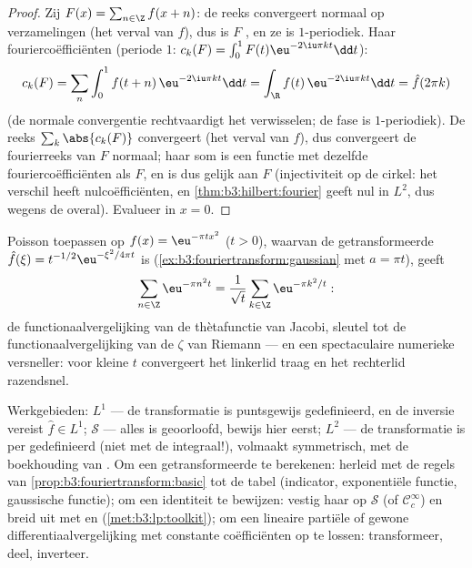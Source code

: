 \begin{proof}
Zij $F(x) = \sum_{n\in\Z}f(x + n)$: de reeks convergeert normaal
op  verzamelingen (het verval van $f$), dus is $F$
, en ze is $1$-periodiek. Haar fouriercoëfficiënten
(periode $1$: $c_k(F) = \int_0^1F(t)\eu^{-2\iu\pi kt}\dd t$):
\[
c_k(F) = \sum_n\int_0^1 f(t + n)\,\eu^{-2\iu\pi kt}\dd t
= \int_\R f(t)\,\eu^{-2\iu\pi kt}\dd t = \hat f(2\pi k)
\]
(de normale convergentie rechtvaardigt het verwisselen; de fase
is $1$-periodiek). De reeks $\sum_k\abs{c_k(F)}$ convergeert (het
verval van $\hat f$), dus convergeert de fourierreeks van $F$
normaal; haar som is een  functie met dezelfde
fouriercoëfficiënten als $F$, en is dus gelijk aan $F$
(injectiviteit op de cirkel: het verschil heeft nulcoëfficiënten,
en \cref{thm:b3:hilbert:fourier} geeft nul in $L^2$, dus wegens
de  overal). Evalueer in $x = 0$.
\end{proof}

\begin{example}
\label{ex:b3:fouriertransform:theta}
Poisson toepassen op $f(x) = \eu^{-\pi tx^2}$ ($t > 0$), waarvan
de getransformeerde $\hat f(\xi) = t^{-1/2}\eu^{-\xi^2/4\pi t}$
is (\cref{ex:b3:fouriertransform:gaussian} met $a = \pi t$),
geeft
\[
\sum_{n\in\Z}\eu^{-\pi n^2t}
= \frac1{\sqrt t}\sum_{k\in\Z}\eu^{-\pi k^2/t} :
\]
de functionaalvergelijking van de thètafunctie van Jacobi,
sleutel tot de functionaalvergelijking van de $\zeta$ van Riemann
--- en een spectaculaire numerieke versneller: voor kleine $t$
convergeert het linkerlid traag en het rechterlid razendsnel.
\end{example}

\begin{method}\label{met:b3:fouriertransform:method}
Werkgebieden: $L^1$ --- de transformatie is puntsgewijs
gedefinieerd, en de inversie vereist $\hat f \in L^1$; $\mathcal
S$ --- alles is geoorloofd, bewijs hier eerst; $L^2$ --- de
transformatie is per  gedefinieerd (niet met de
integraal!), volmaakt symmetrisch, met de boekhouding van
. Om een getransformeerde te berekenen: herleid met de
regels van \cref{prop:b3:fouriertransform:basic} tot de tabel
(indicator, exponentiële functie, gaussische functie); om een
identiteit te bewijzen: vestig haar op $\mathcal S$ (of $\mathcal
C_c^\infty$) en breid uit met  en 
(\cref{met:b3:lp:toolkit}); om een lineaire partiële of gewone
differentiaalvergelijking met constante coëfficiënten op te
lossen: transformeer, deel, inverteer.
\end{method}

